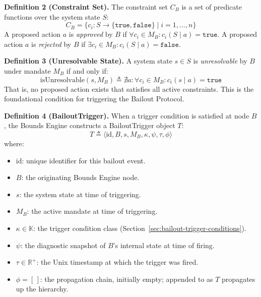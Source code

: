 \medskip

\noindent\textbf{Definition 2 (Constraint Set).} The constraint set $C_B$ is a set of predicate functions over the system state $S$:
\begin{equation}
C_B = \{ c_i : S \rightarrow \{\texttt{true}, \texttt{false}\} \mid i = 1, \ldots, n \}
\end{equation}
A proposed action $a$ is \textit{approved} by $B$ if $\forall c_i \in M_B : c_i(S \mid a) = \texttt{true}$. A proposed action $a$ is \textit{rejected} by $B$ if $\exists c_i \in M_B : c_i(S \mid a) = \texttt{false}$.

\medskip

\noindent\textbf{Definition 3 (Unresolvable State).} A system state $s \in S$ is \textit{unresolvable} by $B$ under mandate $M_B$ if and only if:
\begin{equation}
\text{isUnresolvable}(s, M_B) \triangleq \nexists a : \forall c_i \in M_B : c_i(s \mid a) = \texttt{true}
\end{equation}
That is, no proposed action exists that satisfies all active constraints. This is the foundational condition for triggering the Bailout Protocol.

\medskip

\noindent\textbf{Definition 4 (BailoutTrigger).} When a trigger condition is satisfied at node $B$, the Bounds Engine constructs a BailoutTrigger object $T$:
\begin{equation}
T \triangleq \langle \text{id}, B, s, M_B, \kappa, \psi, \tau, \phi \rangle
\end{equation}
where:
\begin{itemize}\setlength\itemsep{0.25em}
\item $\text{id}$: unique identifier for this bailout event.
\item $B$: the originating Bounds Engine node.
\item $s$: the system state at time of triggering.
\item $M_B$: the active mandate at time of triggering.
\item $\kappa \in \mathbb{K}$: the trigger condition class (Section~\ref{sec:bailout-trigger-conditions}).
\item $\psi$: the diagnostic snapshot of $B$'s internal state at time of firing.
\item $\tau \in \mathbb{R}^+$: the Unix timestamp at which the trigger was fired.
\item $\phi = [\,]$: the propagation chain, initially empty; appended to as $T$ propagates up the hierarchy.
\end{itemize}

